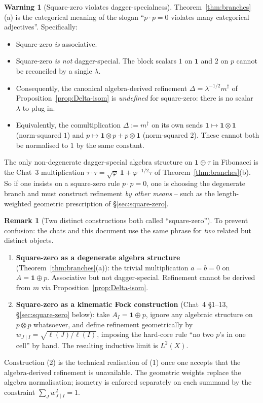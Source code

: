 \documentclass[11pt,a4paper]{article}
\theoremstyle{definition}
\newtheorem{remark}[definition]{Remark}
\newtheorem{warning}[definition]{Warning}
\newcommand{\one}{\mathbf{1}}
\begin{document}
\begin{warning}[Square-zero violates dagger-specialness]\label{warn:sq-zero-is-special}
Theorem~\ref{thm:branches}(a) is the categorical meaning of the slogan
``$p\cdot p = 0$ violates many categorical adjectives''. Specifically:
\begin{itemize}
\item Square-zero \emph{is} associative.
\item Square-zero \emph{is not} dagger-special. The block scalars
      $1$ on $\one$ and $2$ on $p$ cannot be reconciled by a single
      $\lambda$.
\item Consequently, the canonical algebra-derived refinement
      $\Delta = \lambda^{-1/2}m^{\dagger}$ of
      Proposition~\ref{prop:Delta-isom} is \emph{undefined} for square-zero:
      there is no scalar $\lambda$ to plug in.
\item Equivalently, the comultiplication $\Delta := m^{\dagger}$ on its own
      sends $\one\mapsto \one\otimes\one$ (norm-squared $1$) and
      $p\mapsto \one\otimes p + p\otimes\one$ (norm-squared $2$). These
      cannot both be normalised to $1$ by the same constant.
\end{itemize}
The only non-degenerate dagger-special algebra structure on $\one\oplus\tau$
in Fibonacci is the Chat~3 multiplication
$\tau\cdot\tau = \sqrt\varphi\,\one + \varphi^{-1/2}\tau$ of
Theorem~\ref{thm:branches}(b). So if one insists on a square-zero rule
$p\cdot p = 0$, one is choosing the degenerate branch and must construct
refinement \emph{by other means} -- such as the length-weighted geometric
prescription of \S\ref{sec:square-zero}.
\end{warning}

\begin{remark}[Two distinct constructions both called ``square-zero'']\label{rem:three-sq-zero}
To prevent confusion: the chats and this document use the same phrase for
\emph{two} related but distinct objects.
\begin{enumerate}[label=(\arabic*)]
\item \textbf{Square-zero as a degenerate algebra
      structure} (Theorem~\ref{thm:branches}(a)): the trivial multiplication
      $a = b = 0$ on $A = \one\oplus p$. Associative but not dagger-special.
      Refinement cannot be derived from $m$ via Proposition~\ref{prop:Delta-isom}.
\item \textbf{Square-zero as a kinematic Fock construction}
      (Chat~4 \S1--13, \S\ref{sec:square-zero} below): take
      $A_I = \one\oplus p$, ignore any algebraic structure on $p\otimes p$
      whatsoever, and define refinement geometrically by
      $w_{J\mid I} = \sqrt{\ell(J)/\ell(I)}$, imposing the hard-core rule
      ``no two $p$'s in one cell'' by hand. The resulting inductive limit
      is $L^{2}(X)$.
\end{enumerate}
Construction (2) is the technical realisation of (1) once one accepts that
the algebra-derived refinement is unavailable. The geometric weights
replace the algebra normalisation; isometry is enforced separately on each
summand by the constraint $\sum_J w_{J\mid I}^{2} = 1$.
\end{remark}
\end{document}
